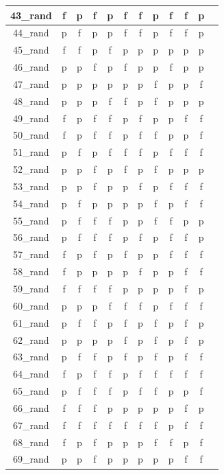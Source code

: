\documentclass[
fancyheadings, %
%
%
]{stsreprt}
\begin{document}
\begin{longtable}{|c|c|c|c|c|c|c|c|c|c|c|c|}
\hline
43\_rand & f & p & f & p & f & f & p & f & f & p \\
\hline
44\_rand & p & f & p & p & f & f & p & f & f & p \\
\hline
45\_rand & f & f & p & f & p & p & p & p & p & p \\
\hline
46\_rand & p & p & f & p & f & p & p & f & p & p \\
\hline
47\_rand & p & p & p & p & p & p & f & p & p & f \\
\hline
48\_rand & p & p & p & f & f & p & f & p & p & p \\
\hline
49\_rand & f & p & f & f & p & f & p & p & f & f \\
\hline
50\_rand & f & p & f & f & p & f & f & p & p & f \\
\hline
51\_rand & p & f & p & f & f & f & p & f & f & f \\
\hline
52\_rand & p & p & f & p & f & p & f & p & p & p \\
\hline
53\_rand & p & p & f & p & p & f & p & f & f & f \\
\hline
54\_rand & p & f & p & p & p & p & f & p & f & f \\
\hline
55\_rand & p & f & f & f & p & p & f & f & p & p \\
\hline
56\_rand & p & f & f & f & p & f & p & f & f & p \\
\hline
57\_rand & f & p & f & p & f & p & p & f & f & f \\
\hline
58\_rand & f & p & p & p & p & f & p & p & f & f \\
\hline
59\_rand & f & f & f & f & p & p & p & p & f & p \\
\hline
60\_rand & p & p & p & f & f & f & p & f & f & f \\
\hline
61\_rand & p & f & f & p & f & p & f & p & f & p \\
\hline
62\_rand & p & p & p & p & f & p & f & p & f & p \\
\hline
63\_rand & p & f & f & p & f & p & f & p & f & f \\
\hline
64\_rand & f & p & f & f & p & f & f & f & f & f \\
\hline
65\_rand & p & f & f & f & p & f & f & p & p & f \\
\hline
66\_rand & f & f & f & p & p & p & p & p & f & p \\
\hline
67\_rand & f & f & f & f & f & f & f & p & f & f \\
\hline
68\_rand & f & p & f & p & p & p & f & f & p & f \\
\hline
69\_rand & p & p & f & p & p & p & p & p & f & f \\

\end{longtable}
\end{document}
